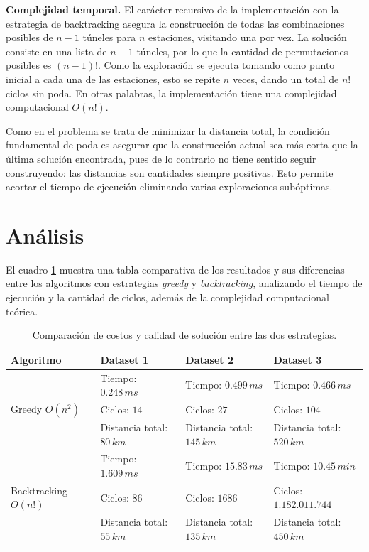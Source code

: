 \documentclass[10 pt, A4paper]{article}
\begin{document}
	\textbf{Complejidad temporal.} El carácter recursivo de la implementación con la estrategia de backtracking asegura la construcción de todas las combinaciones posibles de $n-1$ túneles para $n$ estaciones, visitando una por vez. La solución consiste en una lista de $n-1$ túneles, por lo que la cantidad de permutaciones posibles es $(n-1)!$. Como la exploración se ejecuta tomando como punto inicial a cada una de las estaciones, esto se repite $n$ veces, dando un total de $n!$ ciclos sin poda. En otras palabras, la implementación tiene una complejidad computacional $O(n!)$.
	
	Como en el problema se trata de minimizar la distancia total, la condición fundamental de poda es asegurar que la construcción actual sea más corta que la última solución encontrada, pues de lo contrario no tiene sentido seguir construyendo: las distancias son cantidades siempre positivas. Esto permite acortar el tiempo de ejecución eliminando varias exploraciones subóptimas.
	
	\section*{Análisis}
	El cuadro \ref{table} muestra una tabla comparativa de los resultados y sus diferencias entre los algoritmos con estrategias \textit{greedy} y \textit{backtracking}, analizando el tiempo de ejecución y la cantidad de ciclos, además de la complejidad computacional teórica.
	
	\begin{table}[h!]
		\centering
		\begin{tabular}{|p{3.8cm} | p{3.5cm} | p{3.6cm} | p{3.6cm}|}
			\hline
			Algoritmo & Dataset 1 & Dataset 2 & Dataset 3 \\
			\hline
			\multirow{3}{1em}{Greedy $O(n^2)$} & Tiempo: $0.248\,ms$ & Tiempo: $0.499\,ms$& Tiempo: $0.466\,ms$ \\ & Ciclos: $14$ & Ciclos: $27$ & Ciclos: $104$ \\ & Distancia total: $80\,km$ & Distancia total: $145\,km$& Distancia total: $520\,km$ \\
			\hline
			\multirow{3}{1em}{Backtracking $O(n!)$} & Tiempo: $1.609\,ms$& Tiempo: $15.83\,ms$& Tiempo: $10.45\,min$\\ & Ciclos: $86$ & Ciclos: $1686$ & Ciclos: $1.182.011.744$ \\ & Distancia total: $55\,km$& Distancia total: $135\,km$& Distancia total: $450\,km$\\
			\hline
		\end{tabular}
		\caption{Comparación de costos y calidad de solución entre las dos estrategias.}
		\label{table}
	\end{table}
	
\end{document}
